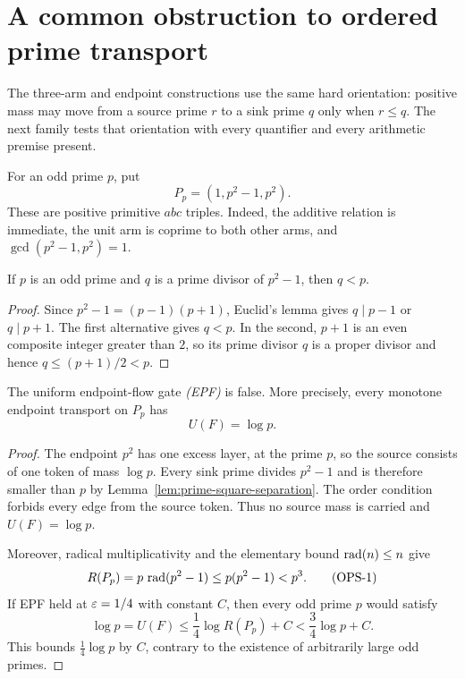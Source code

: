 \section{A common obstruction to ordered prime transport}
\label{sec:ordered-prime-transport-obstruction}

The three-arm and endpoint constructions use the same hard orientation:
positive mass may move from a source prime $r$ to a sink prime $q$ only when
$r\le q$.  The next family tests that orientation with every quantifier and
every arithmetic premise present.

For an odd prime $p$, put
\[
 P_p=(1,p^2-1,p^2).
\]
These are positive primitive $abc$ triples.  Indeed, the additive relation is
immediate, the unit arm is coprime to both other arms, and
$\gcd(p^2-1,p^2)=1$.

\begin{lemma}
\label{lem:prime-square-separation}
If $p$ is an odd prime and $q$ is a prime divisor of $p^2-1$, then $q<p$.
\end{lemma}

\begin{proof}
Since $p^2-1=(p-1)(p+1)$, Euclid's lemma gives $q\mid p-1$ or
$q\mid p+1$.  The first alternative gives $q<p$.  In the second, $p+1$ is
an even composite integer greater than $2$, so its prime divisor $q$ is a
proper divisor and hence $q\le(p+1)/2<p$.
\end{proof}

\begin{theorem}
\label{thm:endpoint-ordered-flow-obstruction}
The uniform endpoint-flow gate \emph{(EPF)} is false.  More precisely, every
monotone endpoint transport on $P_p$ has
\[
 U(F)=\log p.
\]
\end{theorem}

\begin{proof}
The endpoint $p^2$ has one excess layer, at the prime $p$, so the source
consists of one token of mass $\log p$.  Every sink prime divides $p^2-1$ and
is therefore smaller than $p$ by Lemma~\ref{lem:prime-square-separation}.
The order condition forbids every edge from the source token.  Thus no source
mass is carried and $U(F)=\log p$.

Moreover, radical multiplicativity and the elementary bound
$\operatorname{rad}(n)\le n$ give
\[
 R(P_p)=p\,\operatorname{rad}(p^2-1)\le p(p^2-1)<p^3.
\tag{OPS-1}
\]
If EPF held at $\varepsilon=1/4$ with constant $C$, then every odd prime $p$ would
satisfy
\[
 \log p=U(F)\le\frac14\log R(P_p)+C
 <\frac34\log p+C.
\]
This bounds $\frac14\log p$ by $C$, contrary to the existence of arbitrarily
large odd primes.
\end{proof}

